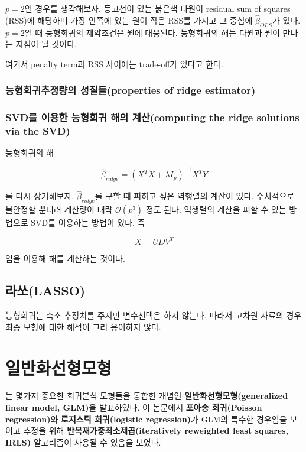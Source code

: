 \documentclass[b5paper,]{scrbook}
\theoremstyle{plain}
\theoremstyle{definition}
\numberwithin{equation}{section}
\begin{document}
\(p=2\)인 경우를 생각해보자. 등고선이 있는 붉은색 타원이 residual sum of
squares (RSS)에 해당하며 가장 안쪽에 있는 원이 작은 RSS를 가지고 그
중심에 \(\hat{\beta}_{OLS}\)가 있다. \(p=2\)일 때 능형회귀의 제약조건은
원에 대응된다. 능형회귀의 해는 타원과 원이 만나는 지점이 될 것이다.

여기서 penalty term과 RSS 사이에는 trade-off가 있다고 한다.

\subsection{능형회귀추정량의 성질들(properties of ridge
estimator)}\label{-properties-of-ridge-estimator}

\subsection{SVD를 이용한 능형회귀 해의 계산(computing the ridge
solutions via the
SVD)}\label{svd----computing-the-ridge-solutions-via-the-svd}

능형회귀의 해

\[\hat{\beta}_{ridge}=(X^{T}X+\lambda I_{p})^{-1}X^{T}Y\]

를 다시 상기해보자. \(\hat{\beta}_{ridge}\)를 구할 때 피하고 싶은
역행렬의 계산이 있다. 수치적으로 불안정할 뿐더러 계산량이 대략
\(\mathcal{O}(p^{3})\) 정도 된다. 역행렬의 계산을 피할 수 있는 방법으로
SVD를 이용하는 방법이 있다. 즉

\[X=UDV^{T}\]

임을 이용해 해를 계산하는 것이다.

\section{라쏘(LASSO)}\label{lasso}

능형회귀는 축소 추정치를 주지만 변수선택은 하지 않는다. 따라서 고차원
자료의 경우 최종 모형에 대한 해석이 그리 용이하지 않다.

\chapter{일반화선형모형}\label{glm}

\citep{Nelder1972}는 몇가지 중요한 회귀분석 모형들을 통합한 개념인
\textbf{일반화선형모형(generalized linear model, GLM)}을 발표하였다. 이
논문에서 \textbf{포아송 회귀(Poisson regression)}와 \textbf{로지스틱
회귀(logistic regression)}가 GLM의 특수한 경우임을 보이고 추정을 위해
\textbf{반복재가중최소제곱(iteratively reweighted least squares, IRLS)}
알고리즘이 사용될 수 있음을 보였다.
\end{document}
